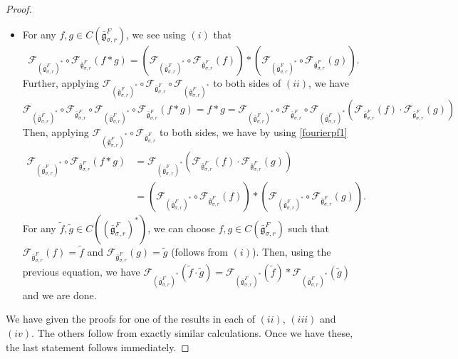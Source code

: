\documentclass[10pt,a4paper]{amsart}
\newcommand{\bg}{\bar{\mathfrak g}}
\newcommand{\mcF}{\mathcal F}
\begin{document}
\begin{proof}
\begin{itemize}
\begin{align*}
            &=\left(\left|\bg_{\sigma,r}^F\right|^{-1/2}\sum_{Y\in \bg_{\sigma,r}^F}\Tilde\psi( X^*(Y-Z))f(Y-Z)\right)\left(\left|\bg_{\sigma,r}^F\right|^{-1/2}\sum_{Z\in \bg_{\sigma,r}^F}\Tilde\psi( X^*(Z))g(Z)\right)\\
            &=  \mcF_{\bg_{\sigma,r}^F}(f)(X^*)\cdot  \mcF_{\bg_{\sigma,r}^F}(g)(X^*)\\
        \end{align*} 
        \item[(iv)] For any $f,g \in  C\left(\bg_{\sigma,r}^F\right)$, we see using $(i)$ that 
        \begin{equation}\label{fourierpf1}
            \mcF_{(\bg_{\sigma,r}^F)^*}\circ\mcF_{\bg_{\sigma,r}^F}(f*g)= \left(\mcF_{(\bg_{\sigma,r}^F)^*}\circ\mcF_{\bg_{\sigma,r}^F}(f)\right)*\left(\mcF_{(\bg_{\sigma,r}^F)^*}\circ\mcF_{\bg_{\sigma,r}^F}(g)\right).
        \end{equation}
        Further, applying $\mcF_{(\bg_{\sigma,r}^F)^*}\circ \mcF_{\bg_{\sigma,r}^F}\circ \mcF_{(\bg_{\sigma,r}^F)^*}$ to both sides of $(ii)$, we have 
       \[
       \mcF_{(\bg_{\sigma,r}^F)^*}\circ \mcF_{\bg_{\sigma,r}^F}\circ \mcF_{(\bg_{\sigma,r}^F)^*} \circ \mcF_{\bg_{\sigma,r}^F}(f*g)= f*g=\mcF_{(\bg_{\sigma,r}^F)^*}\circ \mcF_{\bg_{\sigma,r}^F}\circ \mcF_{(\bg_{\sigma,r}^F)^*}\left(\mcF_{\bg_{\sigma,r}^F}(f)\cdot \mcF_{\bg_{\sigma,r}^F}(g)\right)
        \]
         Then, applying $\mcF_{(\bg_{\sigma,r}^F)^*} \circ \mcF_{\bg_{\sigma,r}^F}$ to both sides, we have by using \eqref{fourierpf1}
        \begin{align*}
            \mcF_{(\bg_{\sigma,r}^F)^*} \circ \mcF_{\bg_{\sigma,r}^F}(f*g)&=\mcF_{(\bg_{\sigma,r}^F)^*}\left(\mcF_{\bg_{\sigma,r}^F}(f)\cdot \mcF_{\bg_{\sigma,r}^F}(g)\right)\\
            &= \left(\mcF_{(\bg_{\sigma,r}^F)^*}\circ\mcF_{\bg_{\sigma,r}^F}(f)\right)*\left(\mcF_{(\bg_{\sigma,r}^F)^*}\circ\mcF_{\bg_{\sigma,r}^F}(g)\right).
        \end{align*}
         For any $\tilde f, \tilde g \in C\left((\bg_{\sigma,r}^F)^*\right)$, we can choose $f, g \in  C\left(\bg_{\sigma,r}^F\right)$ such that $\mcF_{\bg_{\sigma,r}^F}(f)=\tilde f$ and $\mcF_{\bg_{\sigma,r}^F}(g)=\tilde g$ (follows from $(i)$). Then, using the previous equation, we have $\mcF_{(\bg_{\sigma,r}^F)^*}(\tilde f \cdot \tilde g) = \mcF_{(\bg_{\sigma,r}^F)^*}(\tilde f) * \mcF_{(\bg_{\sigma,r}^F)^*}(\tilde g)$ and we are done. 
    \end{itemize}
    We have given the proofs for one of the results in each of $(ii)$, $(iii)$ and $(iv)$. The others follow from exactly similar calculations. Once we have these, the last statement follows immediately.  
\end{proof}
\end{document}

